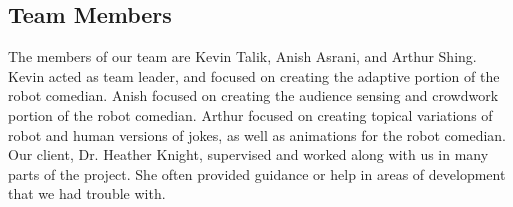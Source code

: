 \subsection{Team Members}
The members of our team are Kevin Talik, Anish Asrani, and Arthur Shing. Kevin acted as team leader, and focused on creating the adaptive portion of the robot comedian. Anish focused on creating the audience sensing and crowdwork portion of the robot comedian. Arthur focused on creating topical variations of robot and human versions of jokes, as well as animations for the robot comedian. Our client, Dr. Heather Knight, supervised and worked along with us in many parts of the project. She often provided guidance or help in areas of development that we had trouble with.  
